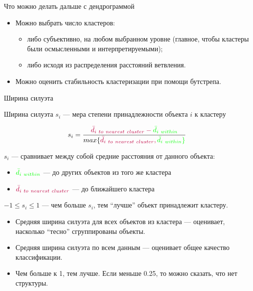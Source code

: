 \documentclass[
  ignorenonframetext,
  russian,
]{beamer}
\providecommand{\tightlist}{%
  \setlength{\itemsep}{0pt}\setlength{\parskip}{0pt}}
\begin{document}
\begin{frame}{Что можно делать дальше с дендрограммой}
\protect{}\label{ux447ux442ux43e-ux43cux43eux436ux43dux43e-ux434ux435ux43bux430ux442ux44c-ux434ux430ux43bux44cux448ux435-ux441-ux434ux435ux43dux434ux440ux43eux433ux440ux430ux43cux43cux43eux439}
\begin{itemize}
\tightlist
\item
  Можно выбрать число кластеров:

  \begin{itemize}
  \tightlist
  \item
    либо субъективно, на любом выбранном уровне (главное, чтобы кластеры
    были осмысленными и интерпретируемыми);
  \item
    либо исходя из распределения расстояний ветвления.
  \end{itemize}
\item
  Можно оценить стабильность кластеризации при помощи бутстрепа.
\end{itemize}
\end{frame}

\begin{frame}{Ширина силуэта}
\protect{}\label{ux448ux438ux440ux438ux43dux430-ux441ux438ux43bux443ux44dux442ux430}
\begin{block}{}
Ширина силуэта $s_i$ --- мера степени принадлежности объекта $i$ к кластеру 
\end{block}

\[s_i = \frac {\color{purple}{\bar{d}_{i~to~nearest~cluster}} - \color{green}{\bar{d}_{i~within}}} {max\{\color{purple}{\bar{d}_{i~to~nearest~cluster}}, \color{green}{\bar{d}_{i~within}}\}}\]

\(s_i\) --- сравнивает между собой средние расстояния от данного
объекта:

\begin{itemize}
\tightlist
\item
  \(\color{green} {\bar{d}_{i~within}}\) --- до других объектов из того
  же кластера
\item
  \(\color{purple} {\bar{d}_{i~to~nearest~cluster}}\) --- до ближайшего
  кластера
\end{itemize}

\(-1 \le s_i \le 1\) --- чем больше \(s_i\), тем ``лучше'' объект
принадлежит кластеру.

\begin{itemize}
\tightlist
\item
  Средняя ширина силуэта для всех объектов из кластера --- оценивает,
  насколько ``тесно'' сгруппированы объекты.
\item
  Средняя ширина силуэта по всем данным --- оценивает общее качество
  классификации.
\item
  Чем больше к 1, тем лучше. Если меньше 0.25, то можно сказать, что нет
  структуры.
\end{itemize}
\end{frame}
\end{document}
